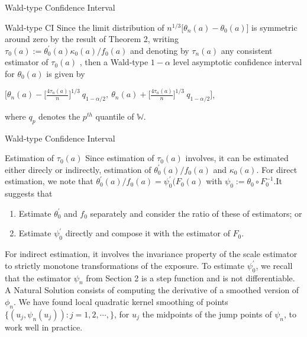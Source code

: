 \documentclass{beamer}
\begin{document}


\begin{frame}{Wald-type Confidence Interval}

\begin{block}{Wald-type CI}
	Since the limit distribution of $n^{1/3} \Big[ \theta_n(a)-\theta_0(a) \Big]$ is symmetric around zero by the result of Theorem 2, writing $\tau_0(a):=\theta^{'}_0(a)\kappa_0(a)/f_0(a)$ and denoting by $\tau_n(a)$ any consistent estimator of $\tau_0(a)$ , then a Wald-type $1-\alpha$ level asymptotic confidence interval for $\theta_0(a)$ is given by
	\begin{center}
	$\Big[ \theta_n(a)-\Big[ \frac{4\tau_n(a)}{n} \Big]^{1/3} \ q_{1-\alpha /2}, \ \theta_n(a)+\Big[ \frac{4\tau_n(a)}{n} \Big]^{1/3} \ q_{1-\alpha /2}  \Bigg] $,
	\end{center}
	where $q_p$ denotes the $p^{th}$ quantile of $\mathbb{W}$.
\end{block}

\end{frame}


\begin{frame}{Wald-type Confidence Interval}

\begin{block}{Estimation of $\tau_0(a)$}
  Since estimation of $\tau_0(a)$ involves, it can be estimated either direcly or indirectly, estimation of $\theta^{'}_0(a)/f_0(a)$ and $\kappa_0(a)$.
  For direct estimation, we note that $\theta^{'}_0(a)/f_0(a)=\psi^{'}_0(F_0(a)$ with $\psi_0:=\theta_0 \circ F^{-1}_0$.It suggests that
  	\begin{enumerate}
  	\item Estimate $\theta^{'}_0$ and $f_0$ separately and consider the ratio of these of estimators; or
  	\item Estimate $\psi^{'}_0$ directly and compose it with the estimator of $F_0$.
  	\end{enumerate}

  For indirect estimation, it involves the invariance property of the scale estimator to strictly monotone transformations of the exposure. To estimate $\psi^{'}_0$, we recall that the estimator $\psi_n$ from Section 2 is a step function and is not differentiable. A Natural Solution consists of computing the derivative of a smoothed version of $\phi_n$. We have found local quadratic kernel smoothing of points $\lbrace (u_j,\psi_n(u_j)):j=1,2,\cdots,\rbrace$, for $u_j$ the midpoints of the jump points of $\psi_n$, to work well in practice.
\end{block}

\end{frame}
\end{document}
